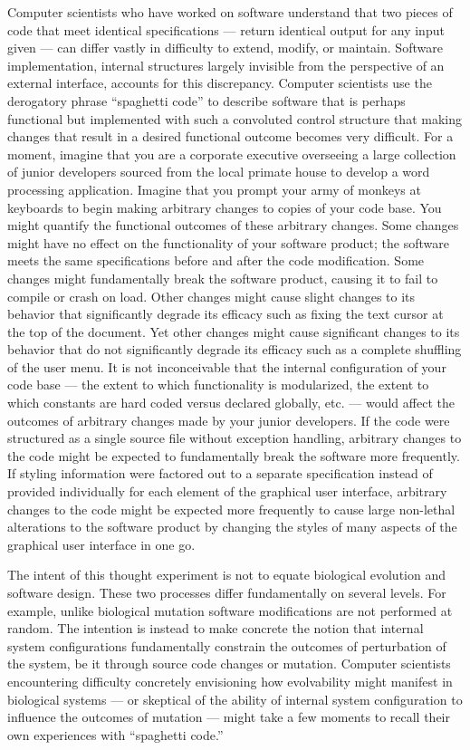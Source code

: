 Computer scientists who have worked on software understand that two pieces of code that meet identical specifications --- return identical output for any input given --- can differ vastly in difficulty to extend, modify, or maintain. 
Software implementation, internal structures largely invisible from the perspective of an external interface, accounts for this discrepancy.
Computer scientists use the derogatory phrase ``spaghetti code'' to describe software that is perhaps functional but implemented with such a convoluted control structure that making changes that result in a desired functional outcome becomes very difficult.
For a moment, imagine that you are a corporate executive overseeing a large collection of junior developers sourced from the local primate house to develop a word processing application.
Imagine that you prompt your army of monkeys at keyboards to begin making arbitrary changes to copies of your code base.
You might quantify the functional outcomes of these arbitrary changes.
Some changes might have no effect on the functionality of your software product; the software meets the same specifications before and after the code modification.
Some changes might fundamentally break the software product, causing it to fail to compile or crash on load.
Other changes might cause slight changes to its behavior that significantly degrade its efficacy such as fixing the text cursor at the top of the document.
Yet other changes might cause significant changes to its behavior that do not significantly degrade its efficacy such as a complete shuffling of the user menu.
It is not inconceivable that the internal configuration of your code base --- the extent to which functionality is modularized, the extent to which constants are hard coded versus declared globally, etc. --- would affect the outcomes of arbitrary changes made by your junior developers.
If the code were structured as a single source file without exception handling, arbitrary changes to the code might be expected to fundamentally break the software more frequently.
If styling information were factored out to a separate specification instead of provided individually for each element of the graphical user interface, arbitrary changes to the code might be expected more frequently to cause large non-lethal alterations to the software product by changing the styles of many aspects of the graphical user interface in one go.

The intent of this thought experiment is not to equate biological evolution and software design. 
These two processes differ fundamentally on several levels.
For example, unlike biological mutation software modifications are not performed at random.
The intention is instead to make concrete the notion that internal system configurations fundamentally constrain the outcomes of perturbation of the system, be it through source code changes or mutation.
Computer scientists encountering difficulty concretely envisioning how evolvability might manifest in biological systems --- or skeptical of the ability of internal system configuration to influence the outcomes of mutation --- might take a few moments to recall their own experiences with ``spaghetti code.''

